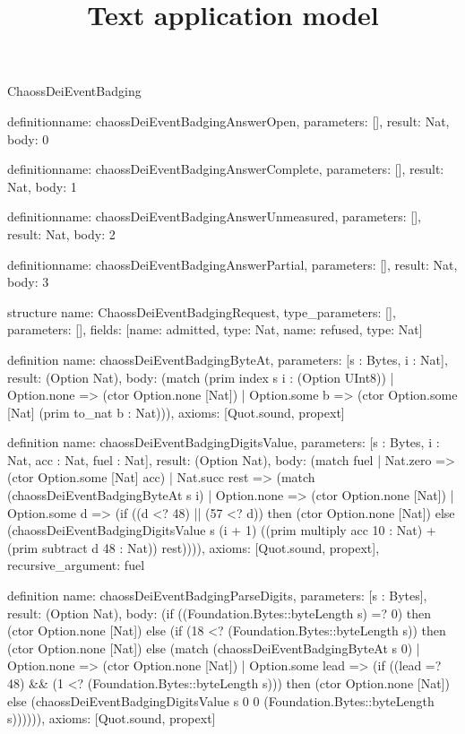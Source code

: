 \begin{lexlean}{ChaossDeiEventBadging}
\title{Text application model}
\begin{semanticmodule}
definition{name: chaossDeiEventBadgingAnswerOpen, parameters: [], result: Nat, body: 0}

definition{name: chaossDeiEventBadgingAnswerComplete, parameters: [], result: Nat, body: 1}

definition{name: chaossDeiEventBadgingAnswerUnmeasured, parameters: [], result: Nat, body: 2}

definition{name: chaossDeiEventBadgingAnswerPartial, parameters: [], result: Nat, body: 3}

structure{
  name: ChaossDeiEventBadgingRequest,
  type_parameters: [],
  parameters: [],
  fields: [{name: admitted, type: Nat}, {name: refused, type: Nat}]
}

definition{
  name: chaossDeiEventBadgingByteAt,
  parameters: [s : Bytes, i : Nat],
  result: (Option Nat),
  body: (match (prim index s i : (Option UInt8))
    | Option.none => (ctor Option.none [Nat])
    | Option.some b => (ctor Option.some [Nat] (prim to_nat b : Nat))),
  axioms: [Quot.sound, propext]
}

definition{
  name: chaossDeiEventBadgingDigitsValue,
  parameters: [s : Bytes, i : Nat, acc : Nat, fuel : Nat],
  result: (Option Nat),
  body: (match fuel
    | Nat.zero => (ctor Option.some [Nat] acc)
    | Nat.succ rest => (match (chaossDeiEventBadgingByteAt s i)
      | Option.none => (ctor Option.none [Nat])
      | Option.some d => (if ((d <? 48) || (57 <? d)) then (ctor Option.none [Nat]) else (chaossDeiEventBadgingDigitsValue s (i + 1) ((prim multiply acc 10 : Nat) + (prim subtract d 48 : Nat)) rest)))),
  axioms: [Quot.sound, propext],
  recursive_argument: fuel
}

definition{
  name: chaossDeiEventBadgingParseDigits,
  parameters: [s : Bytes],
  result: (Option Nat),
  body: (if ((Foundation.Bytes::byteLength s) =? 0) then (ctor Option.none [Nat]) else (if (18 <? (Foundation.Bytes::byteLength s)) then (ctor Option.none [Nat]) else (match (chaossDeiEventBadgingByteAt s 0)
    | Option.none => (ctor Option.none [Nat])
    | Option.some lead => (if ((lead =? 48) && (1 <? (Foundation.Bytes::byteLength s))) then (ctor Option.none [Nat]) else (chaossDeiEventBadgingDigitsValue s 0 0 (Foundation.Bytes::byteLength s)))))),
  axioms: [Quot.sound, propext]
}


\end{semanticmodule}
\end{lexlean}

